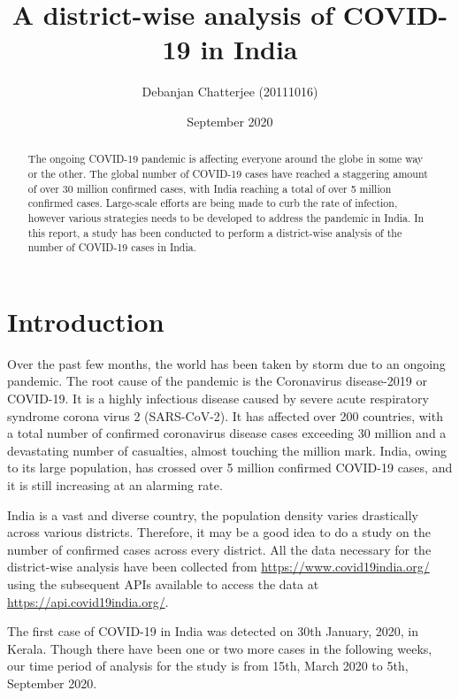 \documentclass[a4paper,11pt]{article}
\title{A district-wise analysis of COVID-19 in India}
\author{
  Debanjan Chatterjee (20111016)
}
\date{September 2020} %
\begin{document}
\maketitle

\begin{abstract}
The ongoing COVID-19 pandemic is affecting everyone around the globe in some way or the other. The global number of COVID-19 cases have reached a staggering amount of over 30 million confirmed cases, with India reaching a total of over 5 million confirmed cases. Large-scale efforts are being made to curb the rate of infection, however various strategies needs to be developed to address the pandemic in India. In this report, a study has been conducted to perform a district-wise analysis of the number of COVID-19 cases in India.
\end{abstract}

\section{Introduction}

Over the past few months, the world has been taken by storm due to an ongoing pandemic. The root cause of the pandemic is the Coronavirus disease-2019 or COVID-19. It is a highly infectious disease caused by severe acute respiratory syndrome corona virus 2 (SARS-CoV-2). It has affected over 200 countries, with a total number of confirmed coronavirus disease cases exceeding 30 million and a devastating number of casualties, almost touching the million mark. India, owing to its large population, has crossed over 5 million confirmed COVID-19 cases, and it is still increasing at an alarming rate. \par

India is a vast and diverse country, the population density varies drastically across various districts. Therefore, it may be a good idea to do a study on the number of confirmed cases across every district. All the data necessary for the district-wise analysis have been collected from \url{https://www.covid19india.org/} using the subsequent APIs available to access the data at \url{ https://api.covid19india.org/}.\par

The first case of COVID-19 in India was detected on 30th January, 2020, in Kerala. Though there have been one or two more cases in the following weeks, our time period of analysis for the study is from 15th, March 2020 to 5th, September 2020.
\end{document}
